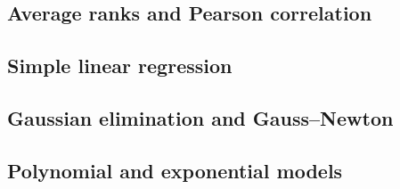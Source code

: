 \documentclass[11pt,a4paper]{article}
\begin{document}
\subsection*{Average ranks and Pearson correlation}


\subsection*{Simple linear regression}


\subsection*{Gaussian elimination and Gauss--Newton}


\subsection*{Polynomial and exponential models}

\end{document}
